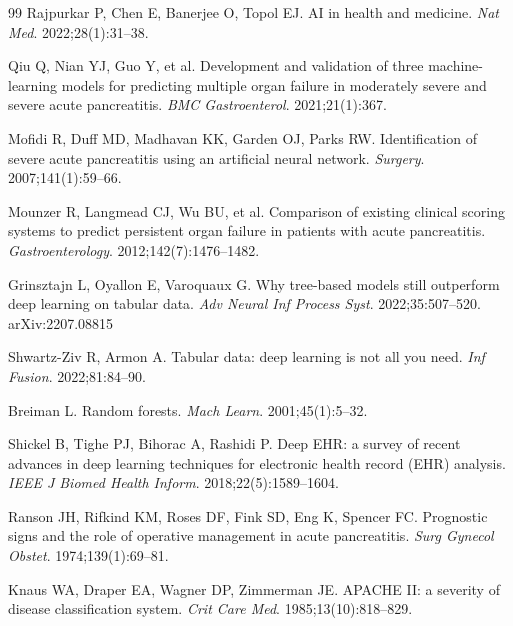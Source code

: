 \documentclass[12pt,a4paper]{article}
\begin{document}
\begin{thebibliography}{99}
Rajpurkar P, Chen E, Banerjee O, Topol EJ.
\newblock AI in health and medicine.
\newblock \textit{Nat Med}. 2022;28(1):31--38.
\newblock {}

Qiu Q, Nian YJ, Guo Y, et al.
\newblock Development and validation of three machine-learning models for predicting multiple organ failure in moderately severe and severe acute pancreatitis.
\newblock \textit{BMC Gastroenterol}. 2021;21(1):367.
\newblock {}

Mofidi R, Duff MD, Madhavan KK, Garden OJ, Parks RW.
\newblock Identification of severe acute pancreatitis using an artificial neural network.
\newblock \textit{Surgery}. 2007;141(1):59--66.
\newblock {}

Mounzer R, Langmead CJ, Wu BU, et al.
\newblock Comparison of existing clinical scoring systems to predict persistent organ failure in patients with acute pancreatitis.
\newblock \textit{Gastroenterology}. 2012;142(7):1476--1482.
\newblock {}

Grinsztajn L, Oyallon E, Varoquaux G.
\newblock Why tree-based models still outperform deep learning on tabular data.
\newblock \textit{Adv Neural Inf Process Syst}. 2022;35:507--520.
\newblock arXiv:2207.08815

Shwartz-Ziv R, Armon A.
\newblock Tabular data: deep learning is not all you need.
\newblock \textit{Inf Fusion}. 2022;81:84--90.
\newblock {}

Breiman L.
\newblock Random forests.
\newblock \textit{Mach Learn}. 2001;45(1):5--32.
\newblock {}

Shickel B, Tighe PJ, Bihorac A, Rashidi P.
\newblock Deep EHR: a survey of recent advances in deep learning techniques for electronic health record (EHR) analysis.
\newblock \textit{IEEE J Biomed Health Inform}. 2018;22(5):1589--1604.
\newblock {}

Ranson JH, Rifkind KM, Roses DF, Fink SD, Eng K, Spencer FC.
\newblock Prognostic signs and the role of operative management in acute pancreatitis.
\newblock \textit{Surg Gynecol Obstet}. 1974;139(1):69--81.

Knaus WA, Draper EA, Wagner DP, Zimmerman JE.
\newblock APACHE II: a severity of disease classification system.
\newblock \textit{Crit Care Med}. 1985;13(10):818--829.
\newblock {}


\end{thebibliography}
\end{document}
